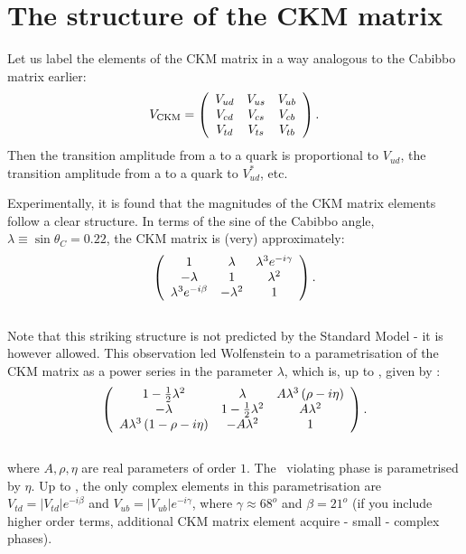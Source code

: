 \section{The structure of the CKM matrix}
 Let us label the elements of the CKM matrix in a way analogous to the
 Cabibbo matrix earlier:
\begin{equation}
\label{eq:th.b.ckmlabel}
V_{\mathrm{CKM}}= \left( \begin{array}{ccc}  V_{ud}  &  V_{us}  &  V_{ub}  \\ 
                        V_{cd}  &  V_{cs}  &  V_{cb}  \\ 
                        V_{td}  &  V_{ts}  &  V_{tb}  \end{array} \right)
.
\end{equation}
 Then the transition amplitude from a  to a  quark is
 proportional to $V_{ud}$, the transition amplitude from a  to
 a  quark to $V_{ud}^{\ast}$, etc.

 Experimentally, it is found that the magnitudes of the CKM matrix
 elements follow a clear structure. In terms of the sine of the
 Cabibbo angle, $\lambda\equiv \sin\theta_C=0.22$, the CKM matrix is (very) approximately:
\begin{equation}
\label{eq:ckmLambda}
 \left( \begin{array}{ccc}  1  & \lambda & \lambda^3 e^{-i\gamma} \\ 
      -\lambda & 1 & \lambda^2 \\ 
      \lambda^3 e^{-i\beta} & -\lambda^2 & 1 \end{array} \right)
.
\end{equation}\\
 Note that this striking structure is not predicted by the Standard
 Model - it is however allowed.  This observation led Wolfenstein to a
 parametrisation of the CKM matrix as a power series in the parameter
 $\lambda$, which is, up to , given by
 \cite{wolfenstein}: {\small
\begin{equation}
 \left( \begin{array}{ccc}  1-\frac{1}{2} \lambda^2     &  
                   \lambda                 &  
                        A\lambda^3\left(\rho-i\eta\right)  \\ 
       -\lambda              &  
                    1-\frac{1}{2} \lambda^2      &  
                        A \lambda^2                         \\ 
      A\lambda^3\left(1-\rho-i\eta\right) & 
                    -A \lambda^2       & 
                        1                                   \end{array} \right)
.
\end{equation}}\\
 where $A, \rho, \eta$ are real parameters of order $1$. The \cp\
 violating phase is parametrised by $\eta$. Up to ,
 the only complex elements in this parametrisation are $V_{td}=|V_{td}|e^{-i\beta}$ and
 $V_{ub}=|V_{ub}|e^{-i\gamma}$, where $\gamma \approx 68^o$ and $\beta = 21^o$ (if you include higher order terms, additional CKM matrix element acquire - small - complex phases).
